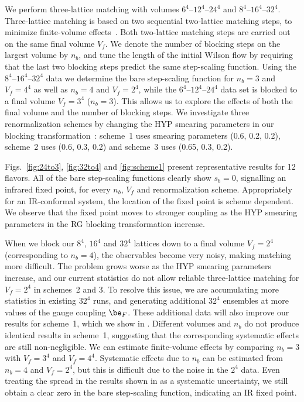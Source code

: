 We perform three-lattice matching with volumes $6^4$--$12^4$--$24^4$ and $8^4$--$16^4$--$32^4$.
Three-lattice matching is based on two sequential two-lattice matching steps, to minimize finite-volume effects~\cite{Hasenfratz:2011xn}.
Both two-lattice matching steps are carried out on the same final volume $V_f$.
We denote the number of blocking steps on the largest volume by $n_b$, and tune the length of the initial Wilson flow by requiring that the last two blocking steps predict the same step-scaling function.
Using the $8^4$--$16^4$--$32^4$ data we determine the bare step-scaling function for $n_b = 3$ and $V_f = 4^4$ as well as $n_b = 4$ and $V_f = 2^4$, while the $6^4$--$12^4$--$24^4$ data set is blocked to a final volume $V_f = 3^4$ ($n_b = 3$).
This allows us to explore the effects of both the final volume and the number of blocking steps.
We investigate three renormalization schemes by changing the HYP smearing parameters in our blocking transformation~\cite{Petropoulos:2012mg}: scheme~1 uses smearing parameters (0.6, 0.2, 0.2), scheme~2 uses (0.6, 0.3, 0.2) and scheme~3 uses (0.65, 0.3, 0.2).

Figs.~\ref{fig:24to3}, \ref{fig:32to4} and \ref{fig:scheme1} present representative results for 12 flavors.
All of the bare step-scaling functions clearly show $s_b = 0$, signalling an infrared fixed point, for every $n_b$, $V_f$ and renormalization scheme.
Appropriately for an IR-conformal system, the location of the fixed point is scheme dependent.
We observe that the fixed point moves to stronger coupling as the HYP smearing parameters in the RG blocking transformation increase.

When we block our $8^4$, $16^4$ and $32^4$ lattices down to a final volume $V_f = 2^4$ (corresponding to $n_b = 4$), the observables become very noisy, making matching more difficult.
The problem grows worse as the HYP smearing parameters increase, and our current statistics do not allow reliable three-lattice matching for $V_f = 2^4$ in schemes~2 and 3.
To resolve this issue, we are accumulating more statistics in existing $32^4$ runs, and generating additional $32^4$ ensembles at more values of the gauge coupling $\be_F$.
These additional data will also improve our results for scheme~1, which we show in .
Different volumes and $n_b$ do not produce identical results in scheme~1, suggesting that the corresponding systematic effects are still non-negligible.
We can estimate finite-volume effects by comparing $n_b = 3$ with $V_f = 3^4$ and $V_f = 4^4$.
Systematic effects due to $n_b$ can be estimated from $n_b = 4$ and $V_f = 2^4$, but this is difficult due to the noise in the $2^4$ data.
Even treating the spread in the results shown in  as a systematic uncertainty, we still obtain a clear zero in the bare step-scaling function, indicating an IR fixed point.

